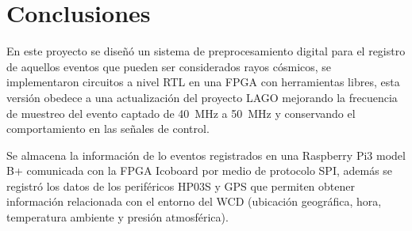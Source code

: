 
\chapter{Conclusiones}

En este proyecto se diseñó un sistema de preprocesamiento digital para el registro de aquellos eventos que pueden ser considerados rayos cósmicos, se implementaron circuitos a nivel RTL en una FPGA con herramientas libres, esta versión obedece a una actualización del proyecto LAGO mejorando la frecuencia de muestreo del evento captado de 40~MHz a 50~MHz y conservando el comportamiento en las señales de control.
    
Se almacena la información de lo eventos registrados en una Raspberry Pi3 model B+ comunicada con la FPGA Icoboard por medio de protocolo SPI, además se registró los datos de los periféricos HP03S y GPS que permiten obtener información relacionada con el entorno del WCD (ubicación geográfica, hora, temperatura ambiente y presión atmosférica).


